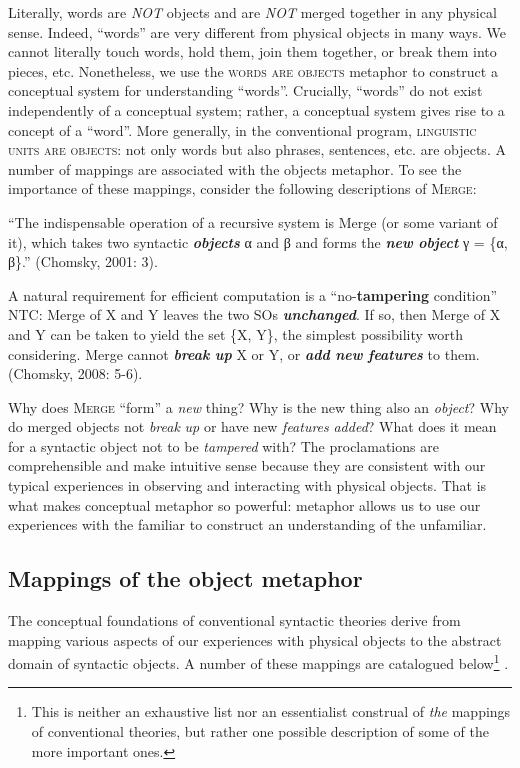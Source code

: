   Literally, words are \textit{NOT} objects and are \textit{NOT} merged together in any physical sense. Indeed, “words” are very different from physical objects in many ways. We cannot literally touch words, hold them, join them together, or break them into pieces, etc. Nonetheless, we use the \textsc{words} \textsc{are} \textsc{objects} metaphor to construct a conceptual system for understanding “words”. Crucially, “words” do not exist independently of a conceptual system; rather, a conceptual system gives rise to a concept of a “word”. More generally, in the conventional program, \textsc{linguistic} \textsc{units} \textsc{are} \textsc{objects}: not only words but also phrases, sentences, etc. are objects. A number of mappings are associated with the objects metaphor. To see the importance of these mappings, consider the following descriptions of \textsc{Merge}: 

“The indispensable operation of a recursive system is Merge (or some variant of it), which takes two syntactic \textbf{\textit{objects}} α and β and forms the \textbf{\textit{new} \textit{object}} γ = \{α, β\}.” (Chomsky, 2001: 3).

A natural requirement for efficient computation is a “no-\textbf{tampering} condition” NTC: Merge of X and Y leaves the two SOs \textbf{\textit{unchanged}}. If so, then Merge of X and Y can be taken to yield the set \{X, Y\}, the simplest possibility worth considering. Merge cannot \textbf{\textit{break} \textit{up}} X or Y, or \textbf{\textit{add} \textit{new} \textit{features}} to them. (Chomsky, 2008: 5-6).

  Why does \textsc{Merge} “form” a \textit{new} thing? Why is the new thing also an \textit{object}? Why do merged objects not \textit{break} \textit{up} or have new \textit{features} \textit{added}? What does it mean for a syntactic object not to be \textit{tampered} with? The proclamations are comprehensible and make intuitive sense because they are consistent with our typical experiences in observing and interacting with physical objects. That is what makes conceptual metaphor so powerful: metaphor allows us to use our experiences with the familiar to construct an understanding of the unfamiliar. 

\subsection{Mappings of the object metaphor}

The conceptual foundations of conventional syntactic theories derive from mapping various aspects of our experiences with physical objects to the abstract domain of syntactic objects. A number of these mappings are catalogued below\footnote{This is neither an exhaustive list nor an essentialist construal of \textit{the} mappings of conventional theories, but rather one possible description of some of the more important ones.} .

